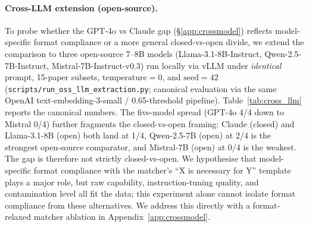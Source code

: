\documentclass[11pt]{article}
\begin{document}
\paragraph{Cross-LLM extension (open-source).}
To probe whether the GPT-4o vs Claude gap (\S\ref{app:crossmodel}) reflects model-specific format compliance or a more general closed-vs-open divide, we extend the comparison to three open-source 7--8B models (Llama-3.1-8B-Instruct, Qwen-2.5-7B-Instruct, Mistral-7B-Instruct-v0.3) run locally via vLLM under \emph{identical} prompt, 15-paper subsets, $\text{temperature}{=}0$, and $\text{seed}{=}42$ (\texttt{scripts/run\_oss\_llm\_extraction.py}; canonical evaluation via the same OpenAI text-embedding-3-small / 0.65-threshold pipeline). Table~\ref{tab:cross_llm} reports the canonical numbers. The five-model spread (GPT-4o 4/4 down to Mistral 0/4) further fragments the closed-vs-open framing: Claude (closed) and Llama-3.1-8B (open) both land at 1/4, Qwen-2.5-7B (open) at 2/4 is the strongest open-source comparator, and Mistral-7B (open) at 0/4 is the weakest. The gap is therefore not strictly closed-vs-open. We hypothesise that model-specific format compliance with the matcher's ``X is necessary for Y'' template plays a major role, but raw capability, instruction-tuning quality, and contamination level all fit the data; this experiment alone cannot isolate format compliance from these alternatives. We address this directly with a format-relaxed matcher ablation in Appendix~\ref{app:crossmodel}.


\end{document}

